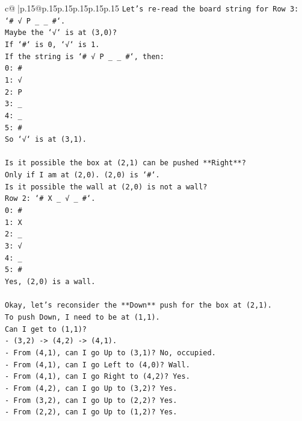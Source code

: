 \documentclass{article}
\begin{document}
{\begin{supertabular}{c@{$\;$}|p{.15\linewidth}@{}p{.15\linewidth}p{.15\linewidth}p{.15\linewidth}p{.15\linewidth}p{.15\linewidth}}
{{{\texttt{Let's re{-}read the board string for Row 3: `\# √ P \_ \_ \#`.} \\
\texttt{Maybe the `√` is at (3,0)?} \\
\texttt{If `\#` is 0, `√` is 1.} \\
\texttt{If the string is `\# √ P \_ \_ \#`, then:} \\
\texttt{0: \#} \\
\texttt{1: √} \\
\texttt{2: P} \\
\texttt{3: \_} \\
\texttt{4: \_} \\
\texttt{5: \#} \\
\texttt{So `√` is at (3,1).} \\
\\ 
\texttt{Is it possible the box at (2,1) can be pushed **Right**?} \\
\texttt{Only if I am at (2,0). (2,0) is `\#`.} \\
\texttt{Is it possible the wall at (2,0) is not a wall?} \\
\texttt{Row 2: `\# X \_ √ \_ \#`.} \\
\texttt{0: \#} \\
\texttt{1: X} \\
\texttt{2: \_} \\
\texttt{3: √} \\
\texttt{4: \_} \\
\texttt{5: \#} \\
\texttt{Yes, (2,0) is a wall.} \\
\\ 
\texttt{Okay, let's reconsider the **Down** push for the box at (2,1).} \\
\texttt{To push Down, I need to be at (1,1).} \\
\texttt{Can I get to (1,1)?} \\
\texttt{{-} (3,2) {-}> (4,2) {-}> (4,1).} \\
\texttt{{-} From (4,1), can I go Up to (3,1)? No, occupied.} \\
\texttt{{-} From (4,1), can I go Left to (4,0)? Wall.} \\
\texttt{{-} From (4,1), can I go Right to (4,2)? Yes.} \\
\texttt{{-} From (4,2), can I go Up to (3,2)? Yes.} \\
\texttt{{-} From (3,2), can I go Up to (2,2)? Yes.} \\
\texttt{{-} From (2,2), can I go Up to (1,2)? Yes.} \\
}}}
\end{supertabular}}
\end{document}
